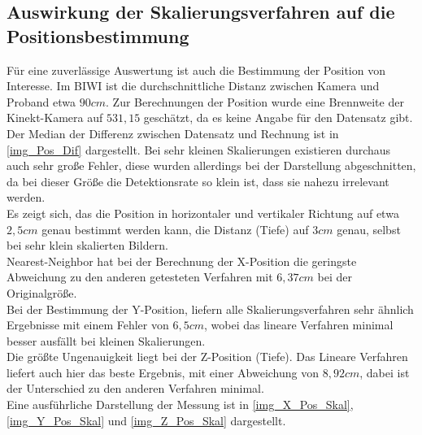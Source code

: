 \subsection{Auswirkung der Skalierungsverfahren auf die Positionsbestimmung}
Für eine zuverlässige Auswertung ist auch die Bestimmung der Position von Interesse. Im BIWI \cite{database_Face_Ori} ist die durchschnittliche Distanz zwischen Kamera und Proband etwa $90cm$. Zur Berechnungen der Position wurde eine Brennweite der Kinekt-Kamera auf $531,15$ geschätzt, da es keine Angabe für den Datensatz gibt. Der Median der Differenz zwischen Datensatz und Rechnung ist in \autoref{img_Pos_Dif} dargestellt. Bei sehr kleinen Skalierungen existieren durchaus auch sehr große Fehler, diese wurden allerdings bei der Darstellung abgeschnitten, da bei dieser Größe die Detektionsrate so klein ist, dass sie nahezu irrelevant werden.\\
Es zeigt sich, das die Position in horizontaler und vertikaler Richtung auf etwa $2,5cm$ genau bestimmt werden kann, die Distanz (Tiefe) auf $3cm$ genau, selbst bei sehr klein skalierten Bildern.\\
Nearest-Neighbor hat bei der Berechnung der X-Position die geringste Abweichung zu den anderen getesteten Verfahren mit $6,37cm$ bei der Originalgröße.\\
Bei der Bestimmung der Y-Position, liefern alle Skalierungsverfahren sehr ähnlich Ergebnisse mit einem Fehler von $6,5cm$, wobei das lineare Verfahren minimal besser ausfällt bei kleinen Skalierungen.\\
Die größte Ungenauigkeit liegt bei der Z-Position (Tiefe). Das Lineare Verfahren liefert auch hier das beste Ergebnis, mit einer Abweichung von $8,92cm$, dabei ist der Unterschied zu den anderen Verfahren minimal.\\
Eine ausführliche Darstellung der Messung ist in \autoref{img_X_Pos_Skal}, \autoref{img_Y_Pos_Skal} und \autoref{img_Z_Pos_Skal} dargestellt.
